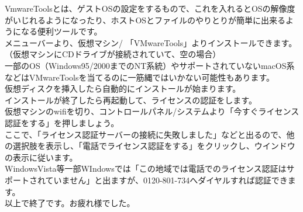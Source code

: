 \documentclass[b5paper,9pt,platex,dvipdfmx]{jsarticle}
\begin{document}
\begin{multicols*}{3}
VmwareToolsとは、ゲストOSの設定をするもので、これを入れるとOSの解像度がいじれるようになったり、ホストOSとファイルのやりとりが簡単に出来るようになる便利ツールです。\\
メニューバーより、仮想マシン/ 「VMwareTools」よりインストールできます。（仮想マシンにCDドライブが接続されていて、空の場合）\\
一部のOS（Windows95/2000までのNT系統）やサポートされていないmacOS系などはVMwareToolsを当てるのに一筋縄ではいかない可能性もあります。\\
仮想ディスクを挿入したら自動的にインストールが始まります。\\
インストールが終了したら再起動して、ライセンスの認証をします。\\
仮想マシンのwifiを切り、コントロールパネル/システムより「今すぐライセンス認証をする」を押しましょう。\\
ここで、「ライセンス認証サーバーの接続に失敗しました」などと出るので、他の選択肢を表示し、「電話でライセンス認証をする」をクリックし、ウインドウの表示に従います。\\
WindowsVista等一部WIndowsでは「この地域では電話でのライセンス認証はサポートされていません」と出ますが、0120-801-734へダイヤルすれば認証できます。\\
以上で終了です。お疲れ様でした。\\

\end{multicols*}
\end{document}
